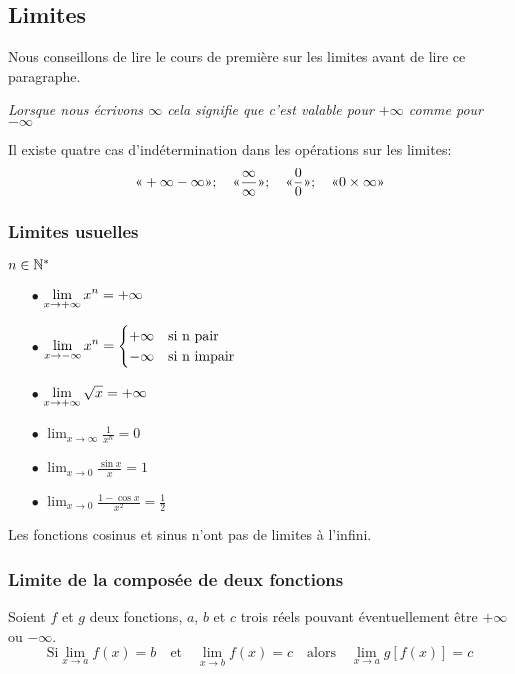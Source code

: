 




\subsection{Limites}
Nous conseillons de lire le cours de première sur les limites avant de lire ce paragraphe.

\textsl{Lorsque nous écrivons $ \infty $ cela signifie que c'est valable pour $ +\infty$ comme pour $-\infty $ }

 Il existe quatre cas d'indétermination dans les opérations sur les limites:
\[ \text{<<} +\infty -\infty \text{>>};\quad\text{<<} \frac{\infty}{\infty} \text{>>};\quad\text{<<} \frac{0}{0}\text{>>};\quad \text{<<} 0\times \infty \text{>>} \]
\subsubsection{Limites usuelles}
 $ n\in\mathbb{N}^* $
\begin{itemize}
\item[$ \bullet $] $\displaystyle \lim_{x \to +\infty}x^{n}= +\infty$ 
\item[$ \bullet $] $\displaystyle\lim_{x \to -\infty}x^{n}= \begin{cases}
+\infty & \text{si n pair} \\
-\infty & \text{si  n impair}
\end{cases}$ 
\item[$ \bullet $] $\displaystyle \lim_{x \to +\infty}\sqrt{x}=+\infty$ 
\item[$ \bullet $] $\displaystyle \lim_{x \to \infty} \frac{1}{x^{n}}=0$ 
\item[$ \bullet $] $\displaystyle \lim_{x \to 0}\frac{\sin x}{x}=1$ 
\item[$ \bullet $] $ \displaystyle\lim_{x \to 0}\frac{1-\cos x}{x^{2}}= \frac{1}{2}$ 

\end{itemize}
\begin{remark}
Les fonctions cosinus et sinus n'ont pas de limites à l'infini.
\end{remark}
\subsubsection{Limite de la composée de deux fonctions}
 Soient $f $  et $g$ deux fonctions, $a $, $b$  et  $c$ trois réels pouvant éventuellement être $ +\infty $ ou $ -\infty $. 
\[\text{Si}\displaystyle \lim_{x \to a} f(x) = b \quad \text{et} \quad \displaystyle \lim_{x \to b} f(x) = c \quad \text{alors} \quad \displaystyle \lim_{x \to a} g[f(x)] = c \]
  
